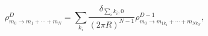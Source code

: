 \begin{equation}
 \rho^D_{m_0\rightarrow m_1+\cdots+m_N}= \sum_{k_i}\frac{\delta_{\sum_i k_i,0}}
 {(2\pi R)^{N-1}} \rho^{D-1}_{m_0\rightarrow m_{1k_1}+\cdots+m_{Nk_N}},
\end{equation}

